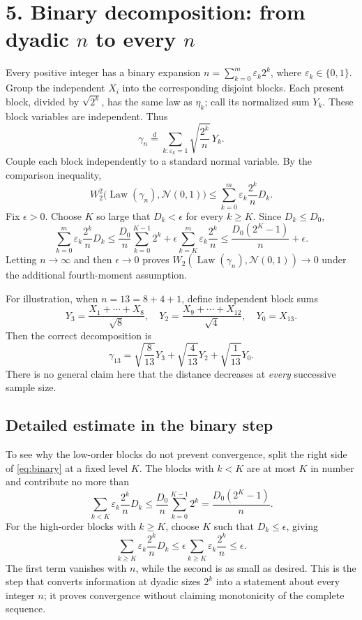 \documentclass[10pt,a4paper]{article}
\newcommand{\Law}{\operatorname{Law}}
\newcommand{\N}{\mathcal N}
\newcommand{\W}{W_2}
\begin{document}
\section*{5. Binary decomposition: from dyadic $n$ to every $n$}
Every positive integer has a binary expansion $n=\sum_{k=0}^{m}\varepsilon_k2^k$, where $\varepsilon_k\in\{0,1\}$. Group the independent $X_i$ into the corresponding disjoint blocks. Each present block, divided by $\sqrt{2^k}$, has the same law as $\eta_k$; call its normalized sum $Y_k$. These block variables are independent. Thus
\[
\gamma_n\stackrel{d}=\sum_{k:\varepsilon_k=1}
\sqrt{\frac{2^k}{n}}\,Y_k.
\]
Couple each block independently to a standard normal variable. By the comparison inequality,
\begin{equation}\label{eq:binary}
\W^2\bigl(\Law(\gamma_n),\N(0,1)\bigr)
\le\sum_{k=0}^{m}\varepsilon_k\frac{2^k}{n}D_k.
\end{equation}
Fix $\epsilon>0$. Choose $K$ so large that $D_k<\epsilon$ for every $k\ge K$. Since $D_k\le D_0$,
\[
\sum_{k=0}^{m}\varepsilon_k\frac{2^k}{n}D_k
\le\frac{D_0}{n}\sum_{k=0}^{K-1}2^k
+\epsilon\sum_{k=K}^{m}\varepsilon_k\frac{2^k}{n}
\le\frac{D_0(2^K-1)}{n}+\epsilon.
\]
Letting $n\to\infty$ and then $\epsilon\to0$ proves $\W(\Law(\gamma_n),\N(0,1))\to0$ under the additional fourth-moment assumption.

For illustration, when $n=13=8+4+1$, define independent block sums
\[
Y_3=\frac{X_1+\cdots+X_8}{\sqrt8},\quad
Y_2=\frac{X_9+\cdots+X_{12}}{\sqrt4},\quad Y_0=X_{13}.
\]
Then the correct decomposition is
\[
\gamma_{13}=\sqrt{\frac8{13}}Y_3+
\sqrt{\frac4{13}}Y_2+\sqrt{\frac1{13}}Y_0.
\]
There is no general claim here that the distance decreases at \emph{every} successive sample size.


\subsection*{Detailed estimate in the binary step}
To see why the low-order blocks do not prevent convergence, split the right side of \eqref{eq:binary} at a fixed level $K$. The blocks with $k<K$ are at most $K$ in number and contribute no more than
\[
\sum_{k<K}\varepsilon_k\frac{2^k}{n}D_k
\le \frac{D_0}{n}\sum_{k=0}^{K-1}2^k
=\frac{D_0(2^K-1)}{n}.
\]
For the high-order blocks with $k\ge K$, choose $K$ such that $D_k\le\epsilon$, giving
\[
\sum_{k\ge K}\varepsilon_k\frac{2^k}{n}D_k
\le \epsilon\sum_{k\ge K}\varepsilon_k\frac{2^k}{n}\le\epsilon.
\]
The first term vanishes with $n$, while the second is as small as desired. This is the step that converts information at dyadic sizes $2^k$ into a statement about every integer $n$; it proves convergence without claiming monotonicity of the complete sequence.
\end{document}
